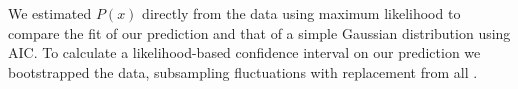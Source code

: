 \documentclass[12pt]{article}
\providecommand{\DIFadd}[1]{{\color{blue}{#1}}} %
\providecommand{\DIFdel}[1]{{\protect\color{red}\sout{}}}                      %
\providecommand{\DIFaddbegin}{} %
\providecommand{\DIFaddend}{} %
\providecommand{\DIFdelbegin}{} %
\providecommand{\DIFdelend}{} %
\newcommand{\DIFscaledelfig}{0.5}
\newlength{\DIFdelgraphicswidth} %
\newlength{\DIFdelgraphicsheight} %
\newcommand{\DIFaddincludegraphics}[2][]{{\color{blue}\fbox{\DIFOincludegraphics[#1]{#2}}}} %
\newcommand{\DIFdelincludegraphics}[2][]{%
\sbox{\DIFdelgraphicsbox}{\DIFOincludegraphics[#1]{#2}}%
\settoboxwidth{\DIFdelgraphicswidth}{\DIFdelgraphicsbox} %
\settoboxtotalheight{\DIFdelgraphicsheight}{\DIFdelgraphicsbox} %
\scalebox{\DIFscaledelfig}{%
\parbox[b]{\DIFdelgraphicswidth}{\usebox{\DIFdelgraphicsbox}\\[-\baselineskip] \rule{\DIFdelgraphicswidth}{0em}}\llap{\resizebox{\DIFdelgraphicswidth}{\DIFdelgraphicsheight}{%
\setlength{\unitlength}{\DIFdelgraphicswidth}%
\begin{picture}(1,1)%
\thicklines\linethickness{2pt} %
{\color[rgb]{1,0,0}\put(0,0){\framebox(1,1){}}}%
{\color[rgb]{1,0,0}\put(0,0){\line( 1,1){1}}}%
{\color[rgb]{1,0,0}\put(0,1){\line(1,-1){1}}}%
\end{picture}%
}\hspace*{3pt}}} %
} %
\DeclareRobustCommand{\DIFaddbegin}{\DIFOaddbegin \let\includegraphics\DIFaddincludegraphics} %
\DeclareRobustCommand{\DIFaddend}{\DIFOaddend \let\includegraphics\DIFOincludegraphics} %
\DeclareRobustCommand{\DIFdelbegin}{\DIFOdelbegin \let\includegraphics\DIFdelincludegraphics} %
\DeclareRobustCommand{\DIFdelend}{\DIFOaddend \let\includegraphics\DIFOincludegraphics} %
\begin{document}
We \DIFdelbegin \DIFdel{then }\DIFdelend \DIFaddbegin \DIFadd{also }\DIFaddend estimated $P(x)$ directly from the \DIFdelbegin \DIFdel{raw }\DIFdelend \DIFaddbegin \DIFadd{family-level }\DIFaddend data using
maximum likelihood to compare the fit of our \DIFdelbegin \DIFdel{super-statistical }\DIFdelend \DIFaddbegin \DIFadd{superstatistical
}\DIFaddend prediction and that of a simple Gaussian distribution using AIC. To
calculate a likelihood-based confidence interval on our prediction we
bootstrapped the data, subsampling fluctuations with replacement from
all \DIFdelbegin \DIFdel{orders
combined, and calculating AIC of the
superstatistical and Gaussian
models on these bootstrapped datasets}\DIFdelend \DIFaddbegin \DIFadd{families and fit superstatistics using maximum likelihood to the
aggregated fluctuation distribution of each bootstrap replicate}\DIFaddend .


\DIFdelbegin %
\DIFdelend \DIFaddbegin 
\DIFaddend 
\end{document}
